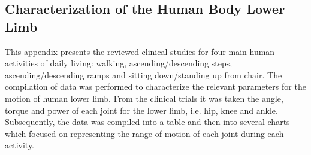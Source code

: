 \begin{appendix} 
\chapter{Characterization of the Human Body Lower Limb} \label{appendixA}
This appendix presents the reviewed clinical studies for four main human activities of daily living: walking, ascending/descending steps, ascending/descending ramps and sitting down/standing up from chair. The compilation of data was performed to characterize the relevant parameters for the motion of human lower limb. From the clinical trials it was taken the angle, torque and power of each joint for the lower limb, i.e. hip, knee and ankle. Subsequently, the data was compiled into a table and then into several charts which focused on representing the range of motion of each joint during each activity.
\end{appendix}
